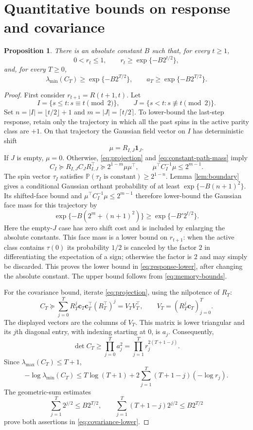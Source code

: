 \documentclass[11pt]{article}
\newtheorem{proposition}[theorem]{Proposition}
\theoremstyle{remark}\newtheorem{remark}[theorem]{Remark}
\newcommand{\Pp}{\mathbb P}
\newcommand{\one}{\mathbf 1}
\begin{document}
\section{Quantitative bounds on response and covariance}
\begin{proposition}\label{prop:quantitative-cavity}
There is an absolute constant $B$ such that, for every $t\ge1$,
\begin{equation}\label{eq:response-lower}
 0<r_t\le1,\qquad r_t\ge\exp\{-B2^{t/2}\},
\end{equation}
and, for every $T\ge0$,
\begin{equation}\label{eq:covariance-lower}
 \lambda_{\min}(C_T)\ge\exp\{-B2^{T/2}\},\qquad
 a_T\ge\exp\{-B2^{T/2}\}.
\end{equation}
\end{proposition}
\begin{proof}
First consider $r_{t+1}=R(t+1,t)$. Let
\[
 I=\{s\le t:s\equiv t\pmod2\},\qquad
 J=\{s<t:s\not\equiv t\pmod2\}.
\]
Set $n=|I|=\lfloor t/2\rfloor+1$ and $m=|J|=\lceil t/2\rceil$.
To lower-bound the last-step response, retain only the trajectory in which
all the past spins in the active parity class are $+1$.
On that trajectory the Gaussian field vector on $I$ has deterministic
shift
\[
 \mu=R_{I,J}\one_J.
\]
If $J$ is empty, $\mu=0$. Otherwise, \eqref{eq:projection} and
\eqref{eq:constant-path-mass} imply
\[
 C_I\succeq R_{I,J}C_JR_{I,J}^\top
 \succeq 2^{1-m}\mu\mu^\top,
 \qquad \mu^\top C_I^{-1}\mu\le2^{m-1}.
\]
The spin vector $\tau_I$ satisfies
$\Pp(\tau_I\text{ is constant})\ge2^{1-n}$.
Lemma \ref{lem:boundary} gives a conditional Gaussian orthant
probability of at least $\exp\{-B(n+1)^2\}$. Its shifted-face bound and
$\mu^\top C_I^{-1}\mu\le2^{m-1}$ therefore lower-bound the Gaussian
face mass for this trajectory by
\[
 \exp\{-B(2^m+(n+1)^2)\}\ge\exp\{-B'2^{t/2}\}.
\]
Here the empty-$J$ case has zero shift cost and is included by enlarging
the absolute constants.
This face mass is a lower bound on $r_{t+1}$: when the active class
contains $\tau(0)$ its probability $1/2$ is canceled by the factor $2$
in differentiating the expectation of a sign; otherwise the factor is $2$
and may simply be discarded. This proves the lower bound in
\eqref{eq:response-lower}, after changing the absolute constant.
The upper bound follows from \eqref{eq:memory-bounds}.

For the covariance bound, iterate \eqref{eq:projection}, using the
nilpotence of $R_T$:
\[
 C_T\succeq\sum_{j=0}^T R_T^j \boldsymbol c_T\boldsymbol c_T^\top(R_T^\top)^j=V_TV_T^\top,
 \qquad V_T=(R_T^j\boldsymbol c_T)_{j=0}^T.
\]
The displayed vectors are the columns of $V_T$. This matrix is lower
triangular and its $j$th diagonal
entry, with indexing starting at $0$, is $a_j$. Consequently,
\[
 \det C_T\ge\prod_{j=0}^T a_j^2
 =\prod_{j=1}^T r_j^{2(T+1-j)}.
\]
Since $\lambda_{\max}(C_T)\le T+1$,
\[
 -\log\lambda_{\min}(C_T)
 \le T\log(T+1)+2\sum_{j=1}^T(T+1-j)(-\log r_j).
\]
The geometric-sum estimates
\[
 \sum_{j=1}^T2^{j/2}\le B2^{T/2},\qquad
 \sum_{j=1}^T(T+1-j)2^{j/2}\le B2^{T/2}
\]
prove both assertions in \eqref{eq:covariance-lower}.
\end{proof}
\end{document}
